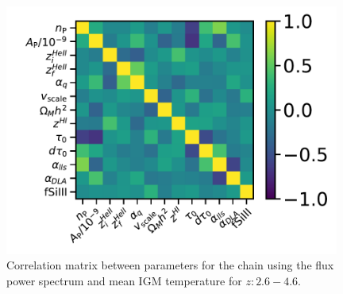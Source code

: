 \begin{figure}
    \centering
    \includegraphics[width=0.98\textwidth]{figures/correlation_z26_46_t0.pdf}
    \caption{\label{fig:correlations}
    Correlation matrix between parameters for the chain using the flux power spectrum and mean IGM temperature for $z: 2.6-4.6$.
    }
\end{figure}
